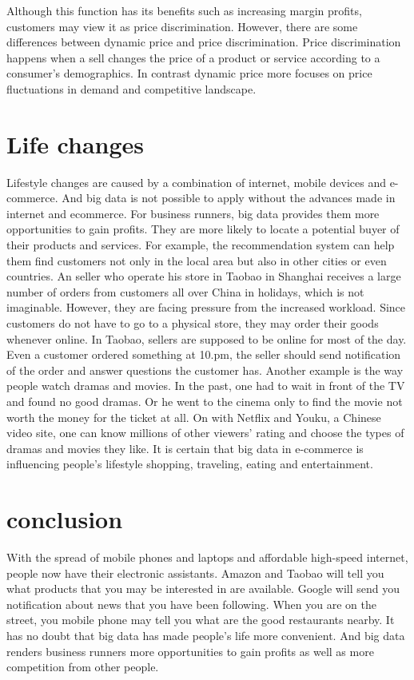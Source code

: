 \documentclass[sigconf]{acmart}
\begin{document}
Although this function has its benefits such as increasing margin profits, customers may view it as price discrimination. However, there are some differences between dynamic price and price discrimination. Price discrimination happens when a sell changes the price of a product or service according to a consumer's demographics. In contrast dynamic price more focuses on price fluctuations in demand and competitive landscape\cite{Smyth2015}.


\section{Life changes}
Lifestyle changes are caused by a combination of internet, mobile devices and e-commerce. And big data is not possible to apply without the advances made in internet and ecommerce. For business runners, big data provides them more opportunities to gain profits. They are more likely to locate a potential buyer of their products and services. For example, the recommendation system can help them find customers not only in the local area but also in other cities or even countries. An seller who operate his store in Taobao in Shanghai receives a large number of orders from customers all over China in holidays, which is not imaginable. However, they are facing pressure from the increased workload. Since customers do not have to go to a physical store, they may order their goods whenever online. In Taobao, sellers are supposed to be online for most of the day. Even a customer ordered something at 10.pm, the seller should send notification of the order and answer questions the customer has. Another example is the way people watch dramas and movies. In the past, one had to wait in front of the TV and found no good dramas. Or he went to the cinema only to find the movie not worth the money for the ticket at all. On with Netflix and Youku, a Chinese video site, one can know millions of other viewers’ rating and choose the types of dramas and movies they like. It is certain that big data in e-commerce is influencing people's lifestyle shopping, traveling, eating and entertainment.

\section{conclusion}
With the spread of mobile phones and laptops and affordable high-speed internet, people now have their electronic assistants. Amazon and Taobao will tell you what products that you may be interested in are available. Google will send you notification about news that you have been following.  When you are on the street, you mobile phone may tell you what are the good restaurants nearby. It has no doubt that big data has made people's life more convenient. And big data renders business runners more opportunities to gain profits as well as more competition from other people.



 
\end{document}
